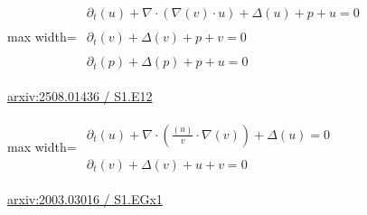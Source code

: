\documentclass[UTF8,10pt,a4paper,fontset=mac]{ctexart}
\begin{document}
\begin{minipage}{\linewidth}\begin{center}\begin{adjustbox}{max width=\linewidth}$\displaystyle\begin{gathered}\begin{gathered}\partial_{t}(u)+\nabla\cdot(\nabla(v)\cdot u)+\Delta(u)+p+u=0\end{gathered}\\[5pt]\begin{gathered}\partial_{t}(v)+\Delta(v)+p+v=0\end{gathered}\\[5pt]\begin{gathered}\partial_{t}(p)+\Delta(p)+p+u=0\end{gathered}\end{gathered}$\end{adjustbox}\end{center}{\small\href{https://arxiv.org/html/2508.01436#S1.E12}{arxiv:2508.01436 / S1.E12}}\par\end{minipage}\par\vspace{6mm}

\begin{minipage}{\linewidth}\begin{center}\begin{adjustbox}{max width=\linewidth}$\displaystyle\begin{gathered}\begin{gathered}\partial_{t}(u)+\nabla\cdot(\frac{(u)}{v}\cdot \nabla(v))+\Delta(u)=0\end{gathered}\\[5pt]\begin{gathered}\partial_{t}(v)+\Delta(v)+u+v=0\end{gathered}\end{gathered}$\end{adjustbox}\end{center}{\small\href{https://arxiv.org/html/2003.03016#S1.EGx1}{arxiv:2003.03016 / S1.EGx1}}\par\end{minipage}\par\vspace{6mm}
\end{document}
